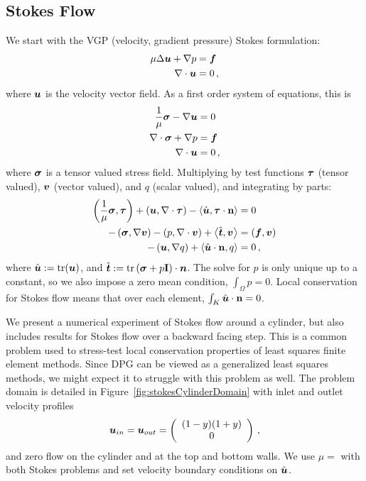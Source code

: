 \documentclass[Proposal.tex]{subfiles}
\begin{document}
\subsection{Stokes Flow}
We start with the VGP (velocity, gradient pressure) Stokes formulation:
\begin{align*}
   \mu\Delta \boldsymbol u+\nabla p&=\boldsymbol f\\
   \nabla\cdot\boldsymbol u&=0\,,
\end{align*}
where $\boldsymbol u$ is the velocity vector field.
As a first order system of equations, this is
\begin{align*}
   \frac{1}{\mu}\boldsymbol\sigma-\nabla\boldsymbol u&=0\\
   \nabla\cdot\boldsymbol\sigma+\nabla p&=\boldsymbol f\\
   \nabla\cdot\boldsymbol u&=0\,,
\end{align*}
where $\boldsymbol\sigma$ is a tensor valued stress field.
Multiplying by test functions $\boldsymbol\tau$ (tensor valued), $\boldsymbol v$ (vector
valued), and $q$ (scalar valued), and integrating by parts:
\begin{align*}
   \left( \frac{1}{\mu}\boldsymbol\sigma,\boldsymbol\tau \right)+\left( \boldsymbol u,\nabla\cdot\boldsymbol\tau \right)-\left\langle \hat
   {\boldsymbol u},\boldsymbol\tau\cdot\mathbf{n} \right\rangle&=0\\
   -\left( \boldsymbol\sigma,\nabla\boldsymbol v \right)-\left( p,\nabla\cdot\boldsymbol v \right)+\left\langle \hat {\boldsymbol t},\boldsymbol v \right\rangle&=\left( \boldsymbol f,\boldsymbol v \right)\\
   -\left( \boldsymbol u,\nabla q \right)+\left\langle \hat{\boldsymbol u}\cdot\mathbf{n},q \right\rangle&=0\,,
\end{align*}
where $\hat{\boldsymbol u}:=\operatorname*{tr}(\boldsymbol u)$, and $\hat{\boldsymbol t}:=\operatorname*{tr}\left( \boldsymbol\sigma+p\mathbf{I} \right)\cdot\boldsymbol n$. The solve for $p$ is only unique
up to a constant, so we also impose a zero mean condition, $\int_\Omega p=0$.
Local conservation for Stokes flow means that over each element,
$\int_K\hat{\boldsymbol u}\cdot\mathbf{n}=0$. 


We present a numerical experiment of Stokes flow around a cylinder, but \cite{Ellis2013Report} also includes results for Stokes flow over a backward facing step.
This is a common problem used to stress-test local conservation properties of
least squares finite element methods. Since DPG can be viewed as a generalized
least squares methods\cite{DPGOverview}, we might expect it to struggle with
this problem as well. The problem domain is detailed in
Figure~\ref{fig:stokesCylinderDomain} with inlet and outlet velocity profiles
\[
\boldsymbol u_{in}=\boldsymbol u_{out}=\left( \begin{array}{c} (1-y)(1+y)\\ 0\\ \end{array} \right)\,,
\]
and zero flow on the cylinder and at the top and bottom walls. We use $\mu=$
with both Stokes problems and set velocity boundary conditions on $\hat{\boldsymbol u}$.
\end{document}
